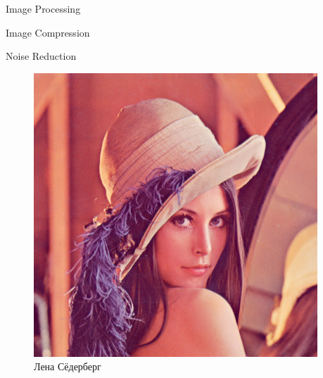 \documentclass{beamer}
\begin{document}
\begin{frame}
\begin{columns}
\begin{column}{0.4\textwidth}
			\end{column}
			
			\begin{column}{0.3\textwidth}
				
				Image Processing
				
				Image Compression
				
				Noise Reduction
				\begin{figure}
				\includegraphics[width=\textwidth]{images/Lenna_test_image.png}
				\caption{Лена Сёдерберг}
				\end{figure}
				
			\end{column}
		\end{columns}
	\end{frame}
\end{document}
